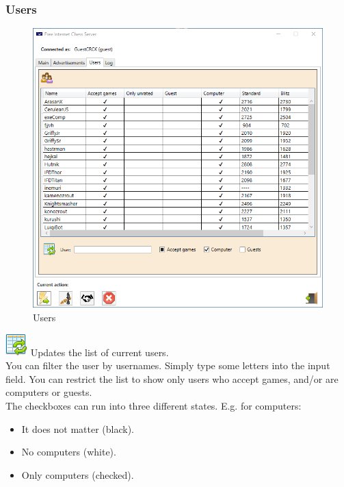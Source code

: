 \documentclass[11pt,a4paper]{article}
\begin{document}
\subsubsection{Users}
\begin{figure}[H]
	\centering
	\includegraphics[scale=0.6]{fics7.png}
	\caption{Users}
	\label{fig:ficsUsers}
\end{figure}

\includegraphics[scale=0.5]{table_refresh.png} Updates the list of current users.\\
You can filter the user by usernames. Simply type some letters into the input field.
You can restrict the list to show only users who accept games, and/or are computers or guests.\\
The checkboxes can run into three different states. E.g. for computers:
\begin{itemize}
	\item It does not matter (black).
	\item No computers (white).
	\item Only computers (checked).
\end{itemize}
\end{document}
